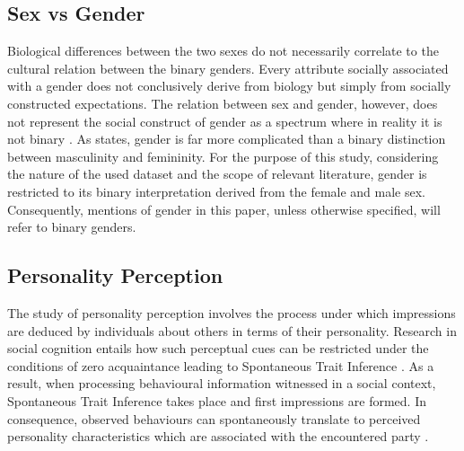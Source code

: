 \documentclass{l4proj}
\begin{document}
\subsection{Sex vs Gender}
Biological differences between the two sexes do not necessarily correlate to the cultural relation between the binary genders. Every attribute socially associated with a gender does not conclusively derive from biology but simply from socially constructed expectations.
The relation between sex and gender, however, does not represent the social construct of gender as a spectrum where in reality it is not binary \citep{Lindqvist2021,Dourlent2017}. As \citet{lips2020sex} states, gender is far more complicated than a binary distinction between masculinity and femininity.
For the purpose of this study, considering the nature of the used dataset and the scope of relevant literature, gender is restricted to its binary interpretation derived from the female and male sex. Consequently, mentions of gender in this paper, unless otherwise specified, will refer to binary genders.

\subsection{Personality Perception}
\label{sec:Personality_percpetion}
The study of personality perception involves the process under which impressions are deduced by individuals about others in terms of their personality. Research in social cognition entails how such perceptual cues can be restricted under the conditions of zero acquaintance leading to Spontaneous Trait Inference \citep{Newman1990}. As a result, when processing behavioural information witnessed in a social context, Spontaneous Trait Inference takes place and first impressions are formed. In consequence, observed behaviours can spontaneously translate to perceived personality characteristics which are associated with the encountered party \citep{Bott2022}. 
\end{document}
